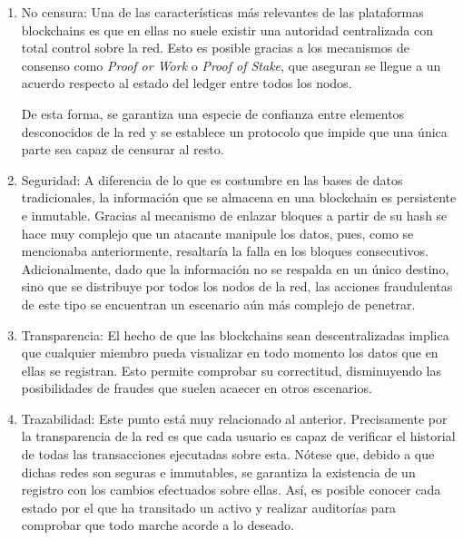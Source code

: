 \begin{enumerate}
	\item  No censura: Una de las caracter\'isticas m\'as relevantes de las plataformas blockchains es que en ellas no suele existir una autoridad centralizada con total control sobre la red. Esto es posible gracias a los mecanismos de consenso como \emph{Proof or Work} o \emph{Proof of Stake}, que aseguran se llegue a un acuerdo respecto al estado del ledger entre todos los nodos.
	
	De esta forma, se garantiza una especie de confianza entre elementos desconocidos de la red y se establece un protocolo que impide que una \'unica parte sea capaz de censurar al resto.
	
	
		
	\item Seguridad: A diferencia de lo que es costumbre en las bases de datos tradicionales, la informaci\'on que se almacena en una blockchain es persistente e inmutable. Gracias al mecanismo de enlazar bloques a partir de su hash se hace muy complejo que un atacante manipule los datos, pues, como se mencionaba anteriormente, resaltar\'ia la falla en los bloques consecutivos. Adicionalmente, dado que la informaci\'on no se respalda en un \'unico destino, sino que se distribuye por todos los nodos de la red, las acciones fraudulentas de este tipo se encuentran un escenario a\'un m\'as complejo de penetrar.
	
	
	\item Transparencia: El hecho de que las blockchains sean descentralizadas implica que cualquier miembro pueda visualizar en todo momento los datos que en ellas se registran. Esto permite comprobar su correctitud, disminuyendo las posibilidades de fraudes que suelen acaecer en otros escenarios.
	
	\item Trazabilidad: Este punto est\'a muy relacionado al anterior. Precisamente por la transparencia de la red es que cada usuario es capaz de verificar el historial de todas las transacciones ejecutadas sobre esta. N\'otese que, debido a que dichas redes son seguras e immutables, se garantiza la existencia de un registro con los cambios efectuados sobre ellas. As\'i, es posible conocer cada estado por el que ha transitado un activo y realizar auditor\'ias para comprobar que todo marche acorde a lo deseado.	

\end{enumerate}

